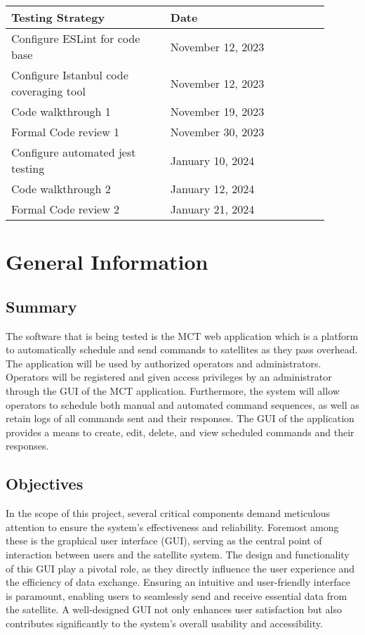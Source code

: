 \documentclass[12pt, titlepage]{article}
\begin{document}
\begin{longtable}{|p{0.45\linewidth}|p{0.45\linewidth}|}
\hline
\textbf{Testing Strategy} & \textbf{Date} \\
\hline
Configure ESLint for code base & November 12, 2023 \\
\hline
Configure Istanbul code coveraging tool & November 12, 2023 \\
\hline
Code walkthrough 1 & November 19, 2023 \\
\hline
Formal Code review 1 & November 30, 2023 \\
\hline
Configure automated jest testing & January 10, 2024 \\
\hline
Code walkthrough 2 & January 12, 2024 \\
\hline
Formal Code review 2 & January 21, 2024 \\
\hline

\end{longtable}


\section{General Information}

\subsection{Summary}

The software that is being tested is the MCT web application which is a platform to automatically schedule and send commands to satellites as they
pass overhead. The application will be used by authorized operators and administrators. Operators will be registered and given access privileges by an administrator through the GUI of the MCT application. Furthermore, the system will allow operators to schedule both manual and automated command sequences, as well as retain logs of all commands sent and their responses. The GUI of the application provides a means to create, edit, delete, and view scheduled commands and their responses.

\subsection{Objectives}

In the scope of this project, several critical components demand meticulous attention to ensure the system's effectiveness and reliability. Foremost among these is the graphical user interface (GUI), serving as the central point of interaction between users and the satellite system. The design and functionality of this GUI play a pivotal role, as they directly influence the user experience and the efficiency of data exchange. Ensuring an intuitive and user-friendly interface is paramount, enabling users to seamlessly send and receive essential data from the satellite. A well-designed GUI not only enhances user satisfaction but also contributes significantly to the system's overall usability and accessibility.
\end{document}
